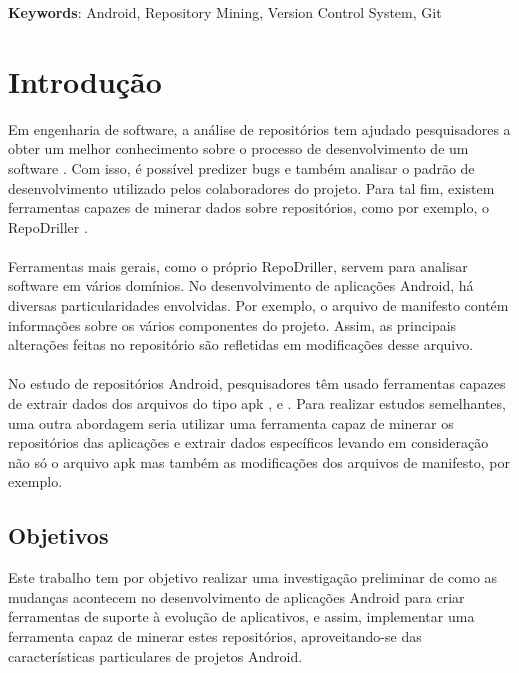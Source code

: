 \documentclass[a4paper,12pt]{article}
\begin{document}
\textbf{Keywords}: Android, Repository Mining, Version Control System, Git

\newpage

\tableofcontents

\newpage
\section{Introdução}

Em engenharia de software, a análise de repositórios tem ajudado pesquisadores a
obter um melhor conhecimento sobre o processo de desenvolvimento de um
software \cite{miningGit}. Com isso, é possível predizer bugs e também analisar o padrão de
desenvolvimento utilizado pelos colaboradores do projeto. Para tal fim, existem
ferramentas capazes de minerar dados sobre repositórios, como por exemplo, o
RepoDriller \cite{repodriller}.\\
\\
Ferramentas mais gerais, como o próprio RepoDriller, servem para analisar
software em vários domínios. No desenvolvimento de aplicações Android, há
diversas particularidades envolvidas. Por exemplo, o arquivo de manifesto contém
informações sobre os vários componentes do projeto. Assim, as principais
alterações feitas no repositório são refletidas em modificações desse arquivo.\\
\\
No estudo de repositórios Android, pesquisadores têm usado ferramentas capazes
de extrair dados dos arquivos do tipo apk \cite{Calciati}, \cite{WhoAdded} e \cite{YLyu}. Para realizar estudos
semelhantes, uma outra abordagem seria utilizar uma ferramenta capaz de
minerar os repositórios das aplicações e extrair dados específicos levando em
consideração não só o arquivo apk mas também as modificações dos arquivos de
manifesto, por exemplo.\\



\subsection{Objetivos}

Este trabalho tem por objetivo realizar uma investigação preliminar de como as
mudanças acontecem no desenvolvimento de aplicações Android para criar
ferramentas de suporte à evolução de aplicativos, e assim, implementar uma
ferramenta capaz de minerar estes repositórios, aproveitando-se das
características particulares de projetos Android.\\
\end{document}
